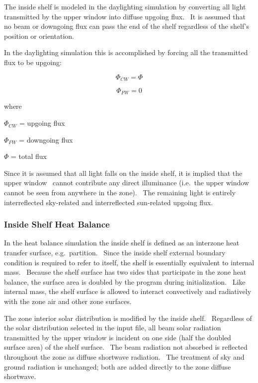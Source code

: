 The inside shelf is modeled in the daylighting simulation by converting all light transmitted by the upper window into diffuse upgoing flux.~ It is assumed that no beam or downgoing flux can pass the end of the shelf regardless of the shelf's position or orientation.

In the daylighting simulation this is accomplished by forcing all the transmitted flux to be upgoing:

\begin{equation}
{\Phi_{CW}} = \Phi
\end{equation}

\begin{equation}
{\Phi_{FW}} = 0
\end{equation}

where

\(\Phi_{CW}\) = upgoing flux

\(\Phi_{FW}\) = downgoing flux

\(\Phi\) = total flux

Since it is assumed that all light falls on the inside shelf, it is implied that the upper window~ cannot contribute any direct illuminance (i.e.~the upper window cannot be seen from anywhere in the zone).~ The remaining light is entirely interreflected sky-related and interreflected sun-related upgoing flux.

\subsubsection{Inside Shelf Heat Balance}\label{inside-shelf-heat-balance}

In the heat balance simulation the inside shelf is defined as an interzone heat transfer surface, e.g.~partition.~ Since the inside shelf external boundary condition is required to refer to itself, the shelf is essentially equivalent to internal mass.~ Because the shelf surface has two sides that participate in the zone heat balance, the surface area is doubled by the program during initialization.~ Like internal mass, the shelf surface is allowed to interact convectively and radiatively with the zone air and other zone surfaces.

The zone interior solar distribution is modified by the inside shelf.~ Regardless of the solar distribution selected in the input file, all beam solar radiation transmitted by the upper window is incident on one side (half the doubled surface area) of the shelf surface.~ The beam radiation not absorbed is reflected throughout the zone as diffuse shortwave radiation.~ The treatment of sky and ground radiation is unchanged; both are added directly to the zone diffuse shortwave.

